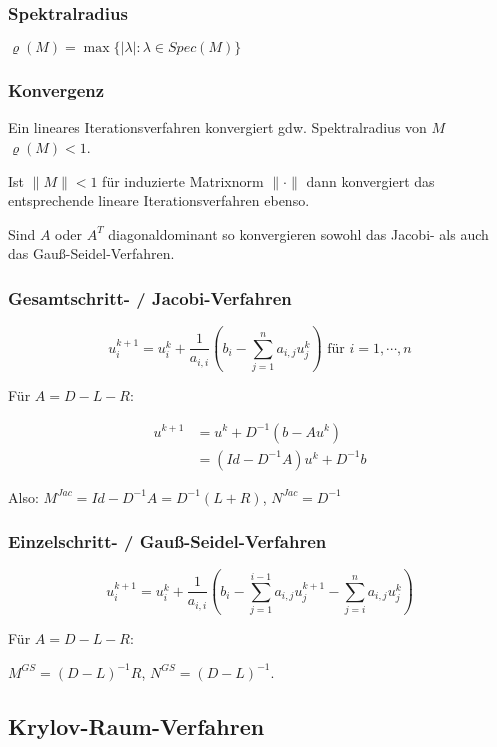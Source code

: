 \subsubsection*{Spektralradius}

$\varrho(M) = \max\{|\lambda| : \lambda \in Spec(M)\}$

\subsubsection*{Konvergenz}

Ein lineares Iterationsverfahren konvergiert gdw. Spektralradius von $M$ $\varrho(M) < 1$.

Ist $\|M\| < 1$ für induzierte Matrixnorm $\|\cdot\|$ dann konvergiert das entsprechende lineare Iterationsverfahren ebenso.

Sind $A$ oder $A^T$ diagonaldominant so konvergieren sowohl das Jacobi- als auch das Gauß-Seidel-Verfahren.

\subsubsection*{Gesamtschritt- / Jacobi-Verfahren}

$$u_i^{k+1} = u_i^k + \frac{1}{a_{i,i}}\left(b_i - \sum_{j=1}^n a_{i,j} u_j^k \right) \text{ für } i = 1, \cdots, n$$

Für $A = D - L - R$:

\vspace{-4mm}
\begin{align*}
	u^{k+1} &= u^k + D^{-1}(b-Au^k) \\
	        &= (Id - D^{-1}A)u^k + D^{-1}b
\end{align*}

Also: $M^{Jac} = Id - D^{-1}A = D^{-1}(L+R)$, $N^{Jac} = D^{-1}$

\subsubsection*{Einzelschritt- / Gauß-Seidel-Verfahren}

$$u_i^{k+1} = u_i^k + \frac{1}{a_{i,i}}\left(b_i - \sum_{j=1}^{i-1} a_{i,j} u_j^{k+1} - \sum_{j=i}^n a_{i,j} u_j^k \right)$$

Für $A = D - L - R$:

$M^{GS} = (D - L)^{-1}R$, $N^{GS} = (D - L)^{-1}$.

\subsection*{Krylov-Raum-Verfahren}

